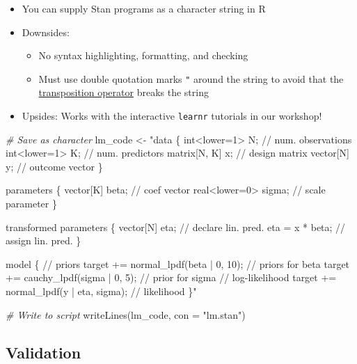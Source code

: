 \documentclass[
  11pt,
]{article}
\newenvironment{Shaded}{\begin{snugshade}}{\end{snugshade}}
\newcommand{\AttributeTok}[1]{\textcolor[rgb]{0.77,0.63,0.00}{#1}}
\newcommand{\CommentTok}[1]{\textcolor[rgb]{0.56,0.35,0.01}{\textit{#1}}}
\newcommand{\FunctionTok}[1]{\textcolor[rgb]{0.00,0.00,0.00}{#1}}
\newcommand{\NormalTok}[1]{#1}
\newcommand{\OtherTok}[1]{\textcolor[rgb]{0.56,0.35,0.01}{#1}}
\newcommand{\StringTok}[1]{\textcolor[rgb]{0.31,0.60,0.02}{#1}}
\providecommand{\tightlist}{%
  \setlength{\itemsep}{0pt}\setlength{\parskip}{0pt}}
\begin{document}
\begin{itemize}
\tightlist
\item
  You can supply Stan programs as a character string in R
\item
  Downsides:

  \begin{itemize}
  \tightlist
  \item
    No syntax highlighting, formatting, and checking
  \item
    Must use double quotation marks \texttt{"} around the string to avoid that the \href{https://mc-stan.org/docs/2_26/functions-reference/transposition-operator.html}{transposition operator} \texttt{\textquotesingle{}} breaks the string
  \end{itemize}
\item
  Upsides: Works with the interactive \texttt{learnr} tutorials in our workshop!
\end{itemize}

\begin{Shaded}
\begin{Highlighting}[]
\CommentTok{\# Save as character}
\NormalTok{lm\_code }\OtherTok{\textless{}{-}} 
\StringTok{"data \{}
\StringTok{  int\textless{}lower=1\textgreater{} N; // num. observations}
\StringTok{  int\textless{}lower=1\textgreater{} K; // num. predictors}
\StringTok{  matrix[N, K] x; // design matrix}
\StringTok{  vector[N] y;    // outcome vector}
\StringTok{\}}

\StringTok{parameters \{}
\StringTok{  vector[K] beta;      // coef vector}
\StringTok{  real\textless{}lower=0\textgreater{} sigma; // scale parameter}
\StringTok{\}}

\StringTok{transformed parameters \{}
\StringTok{  vector[N] eta;  // declare lin. pred.}
\StringTok{  eta = x * beta; // assign lin. pred.}
\StringTok{\}}

\StringTok{model \{}
\StringTok{  // priors}
\StringTok{  target += normal\_lpdf(beta | 0, 10);  // priors for beta}
\StringTok{  target += cauchy\_lpdf(sigma | 0, 5);  // prior for sigma}
\StringTok{  }
\StringTok{  // log{-}likelihood}
\StringTok{  target += normal\_lpdf(y | eta, sigma); // likelihood}
\StringTok{\}"}

\CommentTok{\# Write to script}
\FunctionTok{writeLines}\NormalTok{(lm\_code, }\AttributeTok{con =} \StringTok{"lm.stan"}\NormalTok{)}
\end{Highlighting}
\end{Shaded}

\hypertarget{validation}{%
\subsection{Validation}\label{validation}}
\end{document}
